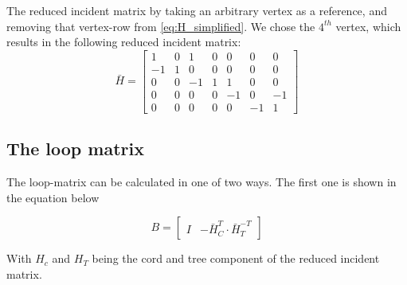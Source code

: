The reduced incident matrix by taking an arbitrary vertex as a reference, and removing that vertex-row from \eqref{eq:H_simplified}. We chose the $4^{th}$ vertex, which results in the following reduced incident matrix:
\begin{equation}
    \bar{H} = \begin{bmatrix}
1 & 0 & 1 & 0 & 0 & 0 & 0\\
-1 & 1 & 0 & 0 & 0 & 0 & 0\\
0 & 0 & -1 & 1 & 1 & 0 & 0\\
0 & 0 & 0 & 0 & -1 &  0  & -1\\
0 & 0 & 0 & 0 & 0 & -1 & 1
\end{bmatrix}
\end{equation}

\subsection{The loop matrix}

The loop-matrix can be calculated in one of two ways. The first one is shown in the equation below

\begin{equation}
    B = \begin{bmatrix}
I & -\bar{H}_{C}^{T}\cdot\bar{H}_{T}^{-T}
\end{bmatrix}
\end{equation}

With $H_{c}$ and $H_{T}$ being the cord and tree component of the reduced incident matrix.